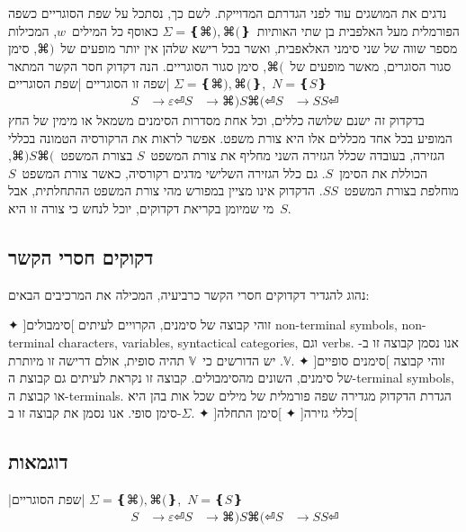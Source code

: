 נדגים את המושגים עוד לפני הגדרתם המדוייקת. לשם כך, נסתכל על שפת הסוגריים כשפה
הפורמלית מעל האלפבית בן שתי האותיות~$Σ=❴⌘), ⌘(❵$ כאוסף כל המילים~$w$,
המכילות מספר שווה
של שני סימני האלאפבית, ואשר בכל רישא שלהן אין יותר מופעים של~$⌘)$, סימן סגור
הסוגרים, מאשר מופעים של~$⌘($, סימן סגור הסוגריים.
הנה דקדוק חסר הקשר המתאר שפה זו
הסוגריים |שפת הסוגריים|
$Σ=❴⌘), ⌘(❵$,~$N=❴S❵$
\begin{equation}
  \label{eq:parenthesis}
  \begin{split}
    S &→ε ⏎
    S &→⌘)S⌘(⏎
    S &→SS ⏎
  \end{split}
\end{equation}
בדקדוק זה ישנם שלושה כללים, וכל אחת מסדרות הסימנים משמאל או מימין של החץ המופיע
בכל אחד מכללים אלו היא צורת משפט. אפשר לראות את הרקורסיה הטמונה בכללי
הגזירה, בעובדה שכלל הגזירה השני מחליף את צורת המשפט~$S$ בצורת המשפט~$⌘)S⌘($,
הכוללת את הסימן~$S$. גם כלל הגזירה השלישי מדגים רקורסיה, כאשר צורת המשפט~$S$
מוחלפת בצורת המשפט~$SS$. הדקדוק אינו מציין במפורש מהי צורת המשפט ההתחלתית,
אבל מי שמיומן בקריאת דקדוקים, יוכל לנחש כי צורה זו היא~$S$.

\begin{editing}
\subsection{דקוקים חסרי הקשר}
נהוג להגדיר דקדוקים חסרי הקשר כרביעיה,
המכילה את המרכיבים הבאים:
\begin{description}
  ✦ ]סימבולים[ זוהי קבוצה של סימנים, הקרויים לעיתים non-terminal symbols,
  non-terminal characters, variables, syntactical categories, וגם verbs.
  אנו נסמן קבוצה זו ב-$𝕍$. יש הדורשים כי~$𝕍$ תהיה סופית,
  אולם דרישה זו מיותרת.
  ✦ ]סימנים סופיים[ זוהי קבוצה של סימנים, השונים מהסימבולים. קבוצה זו נקראת
  לעיתים גם קבוצת ה-terminal symbols, או קבוצת ה-terminals. הגדרת הדקדוק מגדירה
  שפה פורמלית של מילים שכל אות בהן היא סימן סופי. אנו נסמן את
  קבוצה זו ב-$Σ$.
  ✦ ]כללי גזירה[
  ✦ ]סימן התחלה[
\end{description}
\end{editing}

\subsection{דוגמאות}

|שפת הסוגריים|
$Σ=❴⌘), ⌘(❵$,~$N=❴S❵$
\begin{equation}
  \label{eq:parenthesis}
  \begin{split}
    S &→ε ⏎
    S &→⌘)S⌘(⏎
    S &→SS ⏎
  \end{split}
\end{equation}


